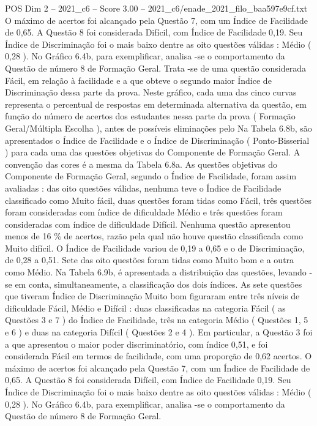 \begin{textsample}{POS Dim 2 – 2021\_c6 – Score 3.00 – 2021\_c6/enade\_2021\_filo\_baa597e9cf.txt}
O máximo de acertos foi alcançado pela Questão 7, com um Índice de Facilidade de 0,65.
A Questão 8 foi considerada Difícil, com Índice de Facilidade 0,19.
Seu Índice de Discriminação foi o mais baixo dentre as oito questões válidas : Médio ( 0,28 ).
No Gráfico 6.4b, para exemplificar, analisa -se o comportamento da Questão de número 8 de Formação Geral.
Trata -se de uma questão considerada Fácil, em relação à facilidade e a que obteve o segundo maior Índice de Discriminação dessa parte da prova.
Neste gráfico, cada uma das cinco curvas representa o percentual de respostas em determinada alternativa da questão, em função do número de acertos dos estudantes nessa parte da prova ( Formação Geral/Múltipla Escolha ), antes de possíveis eliminações pelo Na Tabela 6.8b, são apresentados o Índice de Facilidade e o Índice de Discriminação ( Ponto-Bisserial ) para cada uma das questões objetivas do Componente de Formação Geral.
A convenção das cores é a mesma da Tabela 6.8a.
As questões objetivas do Componente de Formação Geral, segundo o Índice de Facilidade, foram assim avaliadas : das oito questões válidas, nenhuma teve o Índice de Facilidade classificado como Muito fácil, duas questões foram tidas como Fácil, três questões foram consideradas com índice de dificuldade Médio e três questões foram consideradas com índice de dificuldade Difícil.
Nenhuma questão apresentou menos de 16 \% de acertos, razão pela qual não houve questão classificada como Muito difícil.
O Índice de Facilidade variou de 0,19 a 0,65 e o de Discriminação, de 0,28 a 0,51.
Sete das oito questões foram tidas como Muito bom e a outra como Médio.
Na Tabela 6.9b, é apresentada a distribuição das questões, levando -se em conta, simultaneamente, a classificação dos dois índices.
As sete questões que tiveram Índice de Discriminação Muito bom figuraram entre três níveis de dificuldade Fácil, Médio e Difícil : duas classificadas na categoria Fácil ( as Questões 3 e 7 ) do Índice de Facilidade, três na categoria Médio ( Questões 1, 5 e 6 ) e duas na categoria Difícil ( Questões 2 e 4 ).
Em particular, a Questão 3 foi a que apresentou o maior poder discriminatório, com índice 0,51, e foi considerada Fácil em termos de facilidade, com uma proporção de 0,62 acertos.
O máximo de acertos foi alcançado pela Questão 7, com um Índice de Facilidade de 0,65.
A Questão 8 foi considerada Difícil, com Índice de Facilidade 0,19.
Seu Índice de Discriminação foi o mais baixo dentre as oito questões válidas : Médio ( 0,28 ).
No Gráfico 6.4b, para exemplificar, analisa -se o comportamento da Questão de número 8 de Formação Geral.

\end{textsample}
